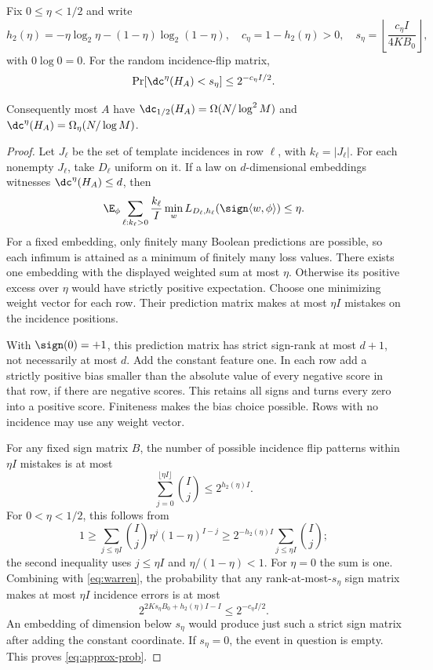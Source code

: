 \begin{theorem}\label{thm:prob}
Fix $0\le\eta<1/2$ and write
\[
 h_2(\eta)=-\eta\log_2\eta-(1-\eta)\log_2(1-\eta),\quad
 c_\eta=1-h_2(\eta)>0,
 \quad s_\eta=\left\lfloor\frac{c_\eta I}{4KB_0}\right\rfloor,
\]
with $0\log 0=0$. For the random incidence-flip matrix,
\begin{equation}\label{eq:approx-prob}
 \Pr[\dc^\eta(H_A)<s_\eta]\le2^{-c_\eta I/2}.
\end{equation}

Consequently most $A$ have $\dc_{1/2}(H_A)=\Omega(N/\log^2M)$ and $\dc^\eta(H_A)=\Omega_\eta(N/\log M)$.
\end{theorem}

\begin{proof}
Let $J_\ell$ be the set of template incidences in row $\ell$, with $k_\ell=|J_\ell|$. For each nonempty $J_\ell$, take $D_\ell$ uniform on it. If a law on $d$-dimensional embeddings witnesses $\dc^\eta(H_A)\le d$, then
\[
 \E_\phi\sum_{\ell:k_\ell>0}\frac{k_\ell}{I}
       \min_w L_{D_\ell,h_\ell}(\sign\langle w,\phi\rangle)\le\eta.
\]
For a fixed embedding, only finitely many Boolean predictions are possible, so each infimum is attained as a minimum of finitely many loss values. There exists one embedding with the displayed weighted sum at most $\eta$. Otherwise its positive excess over $\eta$ would have strictly positive expectation. Choose one minimizing weight vector for each row. Their prediction matrix makes at most $\eta I$ mistakes on the incidence positions.

With $\sign(0)=+1$, this prediction matrix has strict sign-rank at most $d+1$, not necessarily at most $d$. Add the constant feature one. In each row add a strictly positive bias smaller than the absolute value of every negative score in that row, if there are negative scores. This retains all signs and turns every zero into a positive score. Finiteness makes the bias choice possible. Rows with no incidence may use any weight vector.

For any fixed sign matrix $B$, the number of possible incidence flip patterns within $\eta I$ mistakes is at most
\[
 \sum_{j=0}^{\lfloor\eta I\rfloor}\binom Ij\le2^{h_2(\eta)I}.
\]
For $0<\eta<1/2$, this follows from
\[
 1\ge\sum_{j\le\eta I}\binom Ij\eta^j(1-\eta)^{I-j}
 \ge2^{-h_2(\eta)I}\sum_{j\le\eta I}\binom Ij;
\]
the second inequality uses $j\le\eta I$ and $\eta/(1-\eta)<1$. For $\eta=0$ the sum is one. Combining with \eqref{eq:warren}, the probability that any rank-at-most-$s_\eta$ sign matrix makes at most $\eta I$ incidence errors is at most
\[
 2^{2Ks_\eta B_0+h_2(\eta)I-I}\le2^{-c_\eta I/2}.
\]
An embedding of dimension below $s_\eta$ would produce just such a strict sign matrix after adding the constant coordinate. If $s_\eta=0$, the event in question is empty. This proves \eqref{eq:approx-prob}.

\end{proof}
